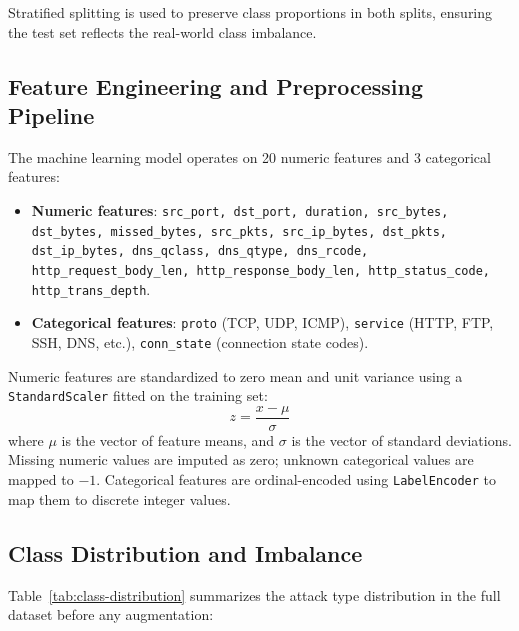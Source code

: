 \documentclass[12pt,a4paper]{report}
\begin{document}
Stratified splitting is used to preserve class proportions in both splits, ensuring the test set reflects the real-world class imbalance.

\subsection{Feature Engineering and Preprocessing Pipeline}

The machine learning model operates on 20 numeric features and 3 categorical features:
\begin{itemize}[leftmargin=1.5em]
  \item \textbf{Numeric features}: \texttt{src\_port, dst\_port, duration, src\_bytes, dst\_bytes, missed\_bytes, src\_pkts, src\_ip\_bytes, dst\_pkts, dst\_ip\_bytes, dns\_qclass, dns\_qtype, dns\_rcode, http\_request\_body\_len, http\_response\_body\_len, http\_status\_code, http\_trans\_depth}.
  \item \textbf{Categorical features}: \texttt{proto} (TCP, UDP, ICMP), \texttt{service} (HTTP, FTP, SSH, DNS, etc.), \texttt{conn\_state} (connection state codes).
\end{itemize}

Numeric features are standardized to zero mean and unit variance using a \texttt{StandardScaler} fitted on the training set:
\begin{equation}
  z = \frac{x - \mu}{\sigma}
\end{equation}
where $\mu$ is the vector of feature means, and $\sigma$ is the vector of standard deviations. Missing numeric values are imputed as zero; unknown categorical values are mapped to $-1$. Categorical features are ordinal-encoded using \texttt{LabelEncoder} to map them to discrete integer values.

\subsection{Class Distribution and Imbalance}

Table~\ref{tab:class-distribution} summarizes the attack type distribution in the full dataset before any augmentation:
\end{document}
